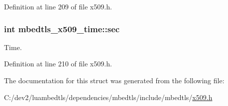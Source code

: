 Definition at line 209 of file x509.\-h.

\hypertarget{structmbedtls__x509__time_a267d51d8fbecde50b06b883db7f98ec2}{
\subsubsection[{sec}]{\setlength{\rightskip}{0pt plus 5cm}int mbedtls\-\_\-x509\-\_\-time\-::sec}}\label{structmbedtls__x509__time_a267d51d8fbecde50b06b883db7f98ec2}
Time. 

Definition at line 210 of file x509.\-h.



The documentation for this struct was generated from the following file\-:\begin{DoxyCompactItemize}
\item 
C\-:/dev2/luambedtls/dependencies/mbedtls/include/mbedtls/\hyperlink{x509_8h}{x509.\-h}\end{DoxyCompactItemize}
